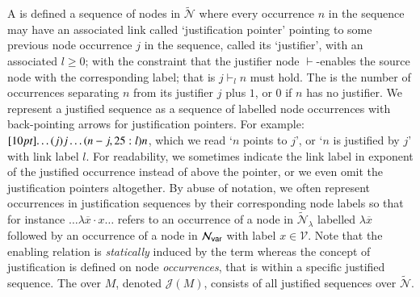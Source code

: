 \documentclass{elsarticle}
\theoremstyle{plain}
\theoremstyle{definition}
\newcommand\VarSet{\mathcal{V}}
\newcommand\Nodes{\mathcal{N}}%
\newcommand\NodesVar{\Nodes_{\sf var}}%
\newcommand\ExtendedNodes{\tilde{\Nodes}}
\newcommand\ExtendedNodesLmd{\tilde{\Nodes}_{\lambda}}
\newcommand{\enables}{\vdash} %
\def\justseqset{\mathcal{J}}
\begin{document}
A  is defined a sequence of nodes in $\ExtendedNodes$ where every occurrence $n$ in the sequence may have an associated link called `justification pointer' pointing to some previous node occurrence $j$ in the sequence, called its `justifier', with an associated  $l\geq0$; with the constraint that the justifier node $\enables$-enables the source node with the corresponding label; that is $j \enables_l n$ must hold. The  is the number of occurrences separating $n$ from its justifier $j$ plus $1$, or $0$ if $n$ has no justifier.
%
We represent a justified sequence as a sequence of labelled node occurrences with back-pointing arrows for justification pointers. For example: $\Pstr[10pt]{ \ldots (j){j} \ldots (n-j,25:l){n} }$, which we read `$n$ points to $j$', or `$n$ is justified by $j$' with link label $l$.
%
For readability, we sometimes indicate the link label in exponent of the justified occurrence instead of above the pointer, or we even omit the justification pointers altogether.
By abuse of notation, we often represent occurrences in justification sequences by their corresponding node labels so that for instance $\ldots \lambda\overline{x} \cdot x \ldots$ refers to an occurrence of a node in $\ExtendedNodesLmd$ labelled $\lambda\overline{x}$ followed by an occurrence of a node in $\NodesVar$ with label $x \in \VarSet$.
%
Note that the enabling relation is \emph{statically} induced by the term whereas the concept of justification is defined on node \emph{occurrences}, that is within a specific justified sequence. The  over $M$, denoted $\justseqset(M)$, consists of all justified sequences over $\ExtendedNodes$.
\end{document}

